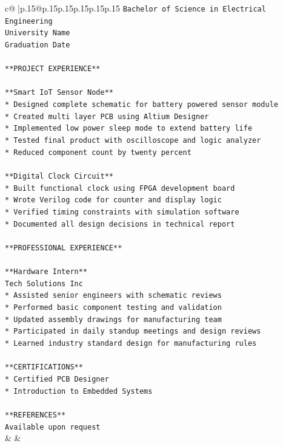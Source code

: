 \documentclass{article}
\begin{document}
{\begin{supertabular}{c@{$\;$}|p{.15\linewidth}@{}p{.15\linewidth}p{.15\linewidth}p{.15\linewidth}p{.15\linewidth}p{.15\linewidth}}
{{{\texttt{Bachelor of Science in Electrical Engineering} \\
\texttt{University Name} \\
\texttt{Graduation Date} \\
\\ 
\texttt{**PROJECT EXPERIENCE**} \\
\\ 
\texttt{**Smart IoT Sensor Node**} \\
\texttt{*   Designed complete schematic for battery powered sensor module} \\
\texttt{*   Created multi layer PCB using Altium Designer} \\
\texttt{*   Implemented low power sleep mode to extend battery life} \\
\texttt{*   Tested final product with oscilloscope and logic analyzer} \\
\texttt{*   Reduced component count by twenty percent} \\
\\ 
\texttt{**Digital Clock Circuit**} \\
\texttt{*   Built functional clock using FPGA development board} \\
\texttt{*   Wrote Verilog code for counter and display logic} \\
\texttt{*   Verified timing constraints with simulation software} \\
\texttt{*   Documented all design decisions in technical report} \\
\\ 
\texttt{**PROFESSIONAL EXPERIENCE**} \\
\\ 
\texttt{**Hardware Intern**} \\
\texttt{Tech Solutions Inc} \\
\texttt{*   Assisted senior engineers with schematic reviews} \\
\texttt{*   Performed basic component testing and validation} \\
\texttt{*   Updated assembly drawings for manufacturing team} \\
\texttt{*   Participated in daily standup meetings and design reviews} \\
\texttt{*   Learned industry standard design for manufacturing rules} \\
\\ 
\texttt{**CERTIFICATIONS**} \\
\texttt{*   Certified PCB Designer} \\
\texttt{*   Introduction to Embedded Systems} \\
\\ 
\texttt{**REFERENCES**} \\
\texttt{Available upon request} \\
            }
        }
    }
    & & \\ \\


\end{supertabular}}
\end{document}
